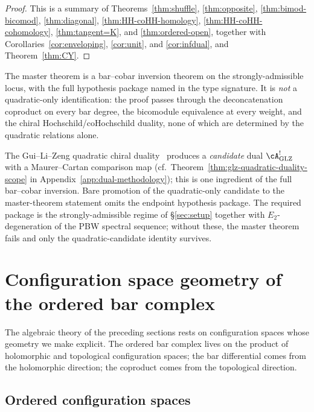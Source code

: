 \begin{proof}
This is a summary of Theorems~\ref{thm:shuffle}, \ref{thm:opposite},
\ref{thm:bimod-bicomod}, \ref{thm:diagonal}, \ref{thm:HH-coHH-homology},
\ref{thm:HH-coHH-cohomology}, \ref{thm:tangent=K}, and \ref{thm:ordered-open}, together with
Corollaries~\ref{cor:enveloping}, \ref{cor:unit}, and \ref{cor:infdual}, and
Theorem~\ref{thm:CY}.
\end{proof}

\begin{remark}
\label{rem:master-vs-quadratic-glz}
The master theorem is a bar--cobar inversion theorem
on the strongly-admissible locus, with the full hypothesis package
named in the type signature. It is \emph{not} a quadratic-only
identification: the proof passes through the deconcatenation
coproduct on every bar degree, the bicomodule equivalence at every
weight, and the chiral Hochschild/coHochschild duality, none of
which are determined by the quadratic relations alone.

The Gui--Li--Zeng quadratic chiral
duality~\cite{GLZ22} produces a
\emph{candidate} dual $\cA^!_{\mathrm{GLZ}}$ with a Maurer--Cartan
comparison map (cf.\
Theorem~\textup{\ref{thm:glz-quadratic-duality-scope}} in
Appendix~\textup{\ref{app:dual-methodology}}); this is one ingredient
of the full bar--cobar inversion. Bare promotion of the
quadratic-only candidate to the master-theorem statement omits the
endpoint hypothesis package. The required package is
the strongly-admissible regime of \S\ref{sec:setup} together with
$E_2$-degeneration of the PBW spectral sequence; without these,
the master theorem fails and only the quadratic-candidate identity
survives.
\end{remark}


\section{Configuration space geometry of the ordered bar complex}
\label{sec:config-space-geometry}

The algebraic theory of the preceding sections rests on
configuration spaces whose geometry we make explicit.
The ordered bar complex lives on the product of holomorphic
and topological configuration spaces; the bar differential
comes from the holomorphic direction; the coproduct comes
from the topological direction.

\subsection{Ordered configuration spaces}
\label{subsec:ordered-config-spaces-geom}

